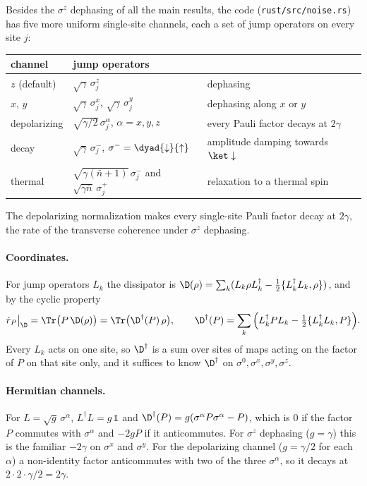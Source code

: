 Besides the $\sigma^z$ dephasing of all the main results, the code (\texttt{rust/src/noise.rs}) has five more uniform single-site channels, each a set of jump operators on every site $j$:
\begin{center}
\small
\begin{tabular}{lll}
\toprule
channel & jump operators & \\
\midrule
$z$ (default) & $\sqrt\gamma\,\sigma^z_j$ & dephasing \\
$x$, $y$ & $\sqrt\gamma\,\sigma^x_j$, $\sqrt\gamma\,\sigma^y_j$ & dephasing along $x$ or $y$ \\
depolarizing & $\sqrt{\gamma/2}\,\sigma^\alpha_j$, $\alpha = x, y, z$ & every Pauli factor decays at $2\gamma$ \\
decay & $\sqrt\gamma\,\sigma^-_j$, $\sigma^- = \dyad{\downarrow}{\uparrow}$ & amplitude damping towards $\ket\downarrow$ \\
thermal & $\sqrt{\gamma(\bar n+1)}\,\sigma^-_j$ and $\sqrt{\gamma\bar n}\,\sigma^+_j$ & relaxation to a thermal spin \\
\bottomrule
\end{tabular}
\end{center}
The depolarizing normalization makes every single-site Pauli factor decay at $2\gamma$, the rate of the transverse coherence under $\sigma^z$ dephasing.

\paragraph{Coordinates.} For jump operators $L_k$ the dissipator is $\D(\rho) = \sum_k(L_k\rho L_k^\dagger - \tfrac12\{L_k^\dagger L_k, \rho\})$, and by the cyclic property
\begin{equation}
\dot r_P\big|_{\D} = \Tr\big(P\,\D(\rho)\big) = \Tr\big(\D^\dagger(P)\,\rho\big), \qquad \D^\dagger(P) = \sum_k\Big(L_k^\dagger P L_k - \tfrac12\{L_k^\dagger L_k, P\}\Big).
\end{equation}
Every $L_k$ acts on one site, so $\D^\dagger$ is a sum over sites of maps acting on the factor of $P$ on that site only, and it suffices to know $\D^\dagger$ on $\sigma^0, \sigma^x, \sigma^y, \sigma^z$.

\paragraph{Hermitian channels.} For $L = \sqrt{g}\,\sigma^\alpha$, $L^\dagger L = g\,\mathds 1$ and $\D^\dagger(P) = g(\sigma^\alpha P\sigma^\alpha - P)$, which is $0$ if the factor $P$ commutes with $\sigma^\alpha$ and $-2gP$ if it anticommutes. For $\sigma^z$ dephasing ($g = \gamma$) this is the familiar $-2\gamma$ on $\sigma^x$ and $\sigma^y$. For the depolarizing channel ($g = \gamma/2$ for each $\alpha$) a non-identity factor anticommutes with two of the three $\sigma^\alpha$, so it decays at $2\cdot2\cdot\gamma/2 = 2\gamma$.

